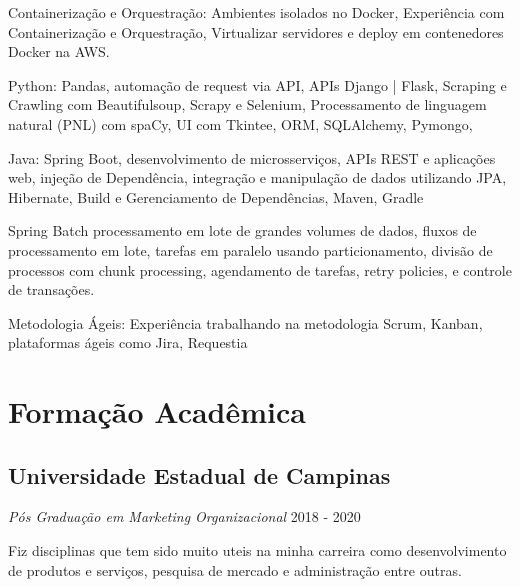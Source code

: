 \documentclass[a4paper,10pt]{article}
\begin{document}
\vspace{1.5mm}\textcolor{corSubSection}{Containerização e Orquestração:}
Ambientes isolados no Docker,
Experiência com Containerização e Orquestração,
Virtualizar servidores e deploy em
contenedores Docker na AWS.

\vspace{1.5mm}\textcolor{corSubSection}{Python:}
Pandas,
automação de request via API,
APIs Django | Flask,
Scraping e Crawling com Beautifulsoup,
Scrapy e Selenium,
Processamento de linguagem natural (PNL) com spaCy,
UI com Tkintee,
ORM, SQLAlchemy, Pymongo,

\vspace{1.5mm}\textcolor{corSubSection}{Java:}
Spring Boot, desenvolvimento de microsserviços, APIs REST e aplicações web,
injeção de Dependência,
integração e manipulação de dados utilizando
JPA, Hibernate,
Build e Gerenciamento de Dependências, Maven, Gradle

Spring Batch
processamento em lote de grandes volumes de dados,
fluxos de processamento em lote,
tarefas em paralelo usando particionamento,
divisão de processos com chunk processing,
agendamento de tarefas, retry policies,
e controle de transações.

\vspace{1.5mm}\textcolor{corSubSection}{Metodologia Ágeis:}
Experiência trabalhando na metodologia Scrum, Kanban, plataformas ágeis como Jira, Requestia


\clearpage
\section*{Formação Acadêmica}
\noindent\makebox[\linewidth]{\rule{\linewidth}{0.1mm}\textcolor{corLarge}{}}

\subsection*{Universidade Estadual de Campinas}
\textcolor{corSubSection}{\emph{Pós Graduação em Marketing Organizacional}}
\hfill \textcolor{corSubSection}{2018 - 2020}

Fiz disciplinas que tem sido muito uteis na minha carreira como
desenvolvimento de produtos e serviços,
pesquisa de mercado e administração entre outras.
\end{document}
